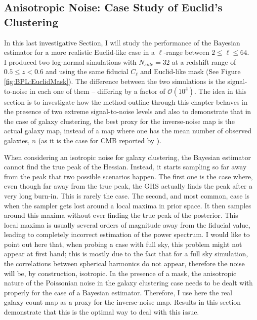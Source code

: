 \subsection{Anisotropic Noise: Case Study of Euclid's Clustering}\label{Sec:Noise}
In this last investigative Section, I will study the performance of the Bayesian estimator for a more realistic Euclid-like case in a $\ell$-range between $2 \leq \ell \leq 64$. I produced two log-normal simulations with $N_{side}=32$ at a redshift range of $0.5 \leq z < 0.6$ and using the same fiducial $C_{\ell}$ and Euclid-like mask (See Figure \ref{fig:BPL:EuclidMask}). The difference between the two simulations is the signal-to-noise in each one of them -- differing by a factor of $\mathcal{O}(10^4)$. The idea in this section is to investigate how the method outline through this chapter behaves in the presence of two extreme signal-to-noise levels and also to demonstrate that in the case of galaxy clustering, the best proxy for the inverse-noise map is the actual galaxy map, instead of a map where one has the mean number of observed galaxies, $\bar{n}$ (as it is the case for CMB reported by \cite{SreeThesis}). 

\qquad When considering an isotropic noise for galaxy clustering, the Bayesian estimator cannot find the true peak of the Hessian. Instead, it starts sampling so far away from the peak that two possible scenarios happen. The first one is the case where, even though far away from the true peak, the GHS actually finds the peak after a very long burn-in. This is rarely the case. The second, and most common, case is when the sampler gets lost around a local maxima in prior space. It then samples around this maxima without ever finding the true peak of the posterior. This local maxima is usually several orders of magnitude away from the fiducial value, leading to completely incorrect estimation of the power spectrum. I would like to point out here that, when probing a case with full sky, this problem might not appear at first hand; this is mostly due to the fact that for a full sky simulation, the correlations between spherical harmonics do not appear, therefore the noise will be, by construction, isotropic. In the presence of a mask, the anisotropic nature of the Poissonian noise in the galaxy clustering case needs to be dealt with properly for the case of a Bayesian estimator. Therefore, I use here the real galaxy count map as a proxy for the inverse-noise map. Results in this section demonstrate that this is the optimal way to deal with this issue.

